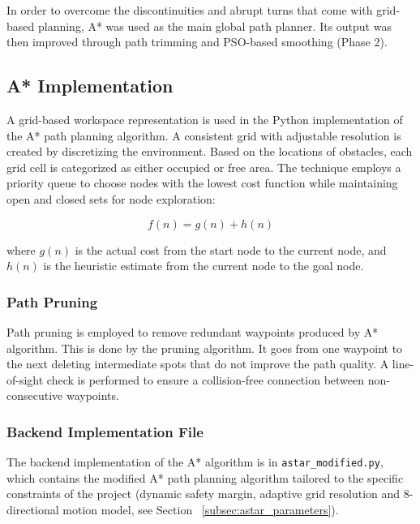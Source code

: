 In order to overcome the discontinuities and abrupt turns that come with grid-based planning, A* was used as the main global path planner. Its output was then improved through path trimming and PSO-based smoothing (Phase 2).



\subsection{A* Implementation}
\label{subsec:astar_implementation}

A grid-based workspace representation is used in the Python implementation of the A* path planning algorithm. A consistent grid with adjustable resolution is created by discretizing the environment. Based on the locations of obstacles, each grid cell is categorized as either occupied or free area. The technique employs a priority queue to choose nodes with the lowest cost function while maintaining open and closed sets for node exploration:


\begin{equation}
	f(n) = g(n) + h(n)
	\label{eq:astar_cost_impl}
\end{equation}

where $g(n)$ is the actual cost from the start node to the current node, and $h(n)$ is the heuristic estimate from the current node to the goal node.

\subsubsection*{Path Pruning}

Path pruning is employed to remove redundant waypoints produced by A* algorithm. This is done by the pruning algorithm. It goes from one waypoint to the next deleting intermediate spots that do not improve the path quality. A line-of-sight check is performed to ensure a collision-free connection between non-consecutive waypoints.


\subsubsection*{Backend Implementation File}

The backend implementation of the A* algorithm is in \texttt{astar\_modified.py}, which contains the modified A* path planning algorithm tailored to the specific constraints of the project (dynamic safety margin, adaptive grid resolution and 8-directional motion model, see Section ~\ref{subsec:astar_parameters}).


